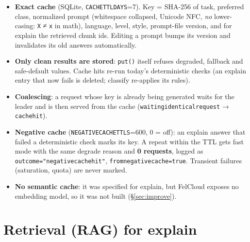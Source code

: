 \documentclass[11pt,a4paper]{article}
\renewcommand{\_}{\origus\allowbreak}
\begin{document}
\begin{itemize}
  \item \textbf{Exact cache} (SQLite, \texttt{CACHE\_TTL\_DAYS}=7). Key = SHA-256 of task, preferred class,
  normalized prompt (whitespace collapsed, Unicode NFC, \emph{no} lower-casing: \texttt{X} ≠ \texttt{x} in
  math), language, level, style, prompt-file version, and for explain the retrieved chunk ids.
  Editing a prompt bumps its version and invalidates its old answers automatically.
  \item \textbf{Only clean results are stored}: \texttt{put()} itself refuses degraded, fallback and
  safe-default values. Cache hits re-run today's deterministic checks (an explain entry that now
  fails is deleted; classify re-applies its rules).
  \item \textbf{Coalescing}: a request whose key is already being generated waits for the leader and
  is then served from the cache (\texttt{waiting\_identical\_request} → \texttt{cache\_hit}).
  \item \textbf{Negative cache} (\texttt{NEGATIVE\_CACHE\_TTL\_S}=600, 0 = off): an explain answer that failed
  a deterministic check marks its key. A repeat within the TTL gets fast mode with the same degrade
  reason and \textbf{0 requests}, logged as \texttt{outcome="negative\_cache\_hit"},
  \texttt{from\_negative\_cache=true}. Transient failures (saturation, quota) are never marked.
  \item \textbf{No semantic cache}: it was specified for explain, but FelCloud exposes no embedding
  model, so it was not built (§\ref{sec:improve}).
\end{itemize}

\section{Retrieval (RAG) for explain}
\label{sec:rag}
\end{document}
